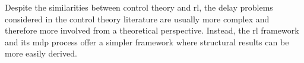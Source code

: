 Despite the similarities between control theory and \gls{rl}, the delay problems considered in the control theory literature are usually more complex and therefore more involved from a theoretical perspective. 
Instead, the \gls{rl} framework and its \gls{mdp} process offer a simpler framework where structural results can be more easily derived.  